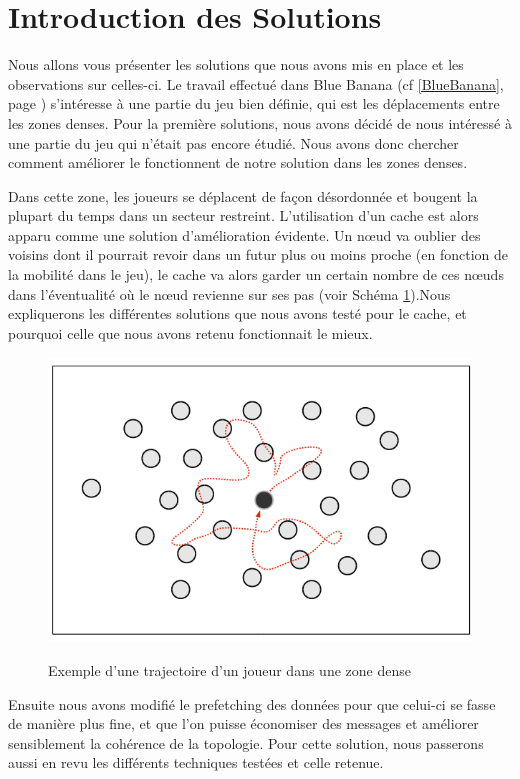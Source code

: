 \section{Introduction des Solutions}
\label{introSolutions}
	Nous allons vous présenter les solutions que nous avons mis en place et les observations sur celles-ci. Le travail effectué dans Blue Banana (cf \ref{BlueBanana}, page \pageref{BlueBanana}) s'intéresse à une partie du jeu bien définie, qui est les déplacements entre les zones denses. Pour la première solutions, nous avons décidé de nous intéressé à une partie du jeu qui n'était pas encore étudié. Nous avons donc chercher comment améliorer le fonctionnent de notre solution dans les zones denses. 
\par Dans cette zone, les joueurs se déplacent de façon désordonnée et bougent la plupart du temps dans un secteur restreint. L'utilisation d'un cache est alors apparu comme une solution d'amélioration évidente. Un nœud va oublier des voisins dont il pourrait revoir dans un futur plus ou moins proche (en fonction de la mobilité dans le jeu), le cache va alors garder un certain nombre de ces nœuds dans l'éventualité où le nœud revienne sur ses pas (voir Schéma \ref{mouveDense}).Nous expliquerons les différentes solutions que nous avons testé pour le cache, et pourquoi celle que nous avons retenu fonctionnait le mieux.
	\vspace{5mm}
        \begin{figure}[!h]
        \centering
        \includegraphics[scale=0.45]{./Ressources/Images/mouvementsZoneDense.png}\\
        \caption{Exemple d'une trajectoire d'un joueur dans une zone dense}
        \label{mouveDense}
        \end{figure}
\par Ensuite nous avons modifié le prefetching des données pour que celui-ci se fasse de manière plus fine, et que l'on puisse économiser des messages et améliorer sensiblement la cohérence de la topologie. Pour cette solution, nous passerons aussi en revu les différents techniques testées et celle retenue.



